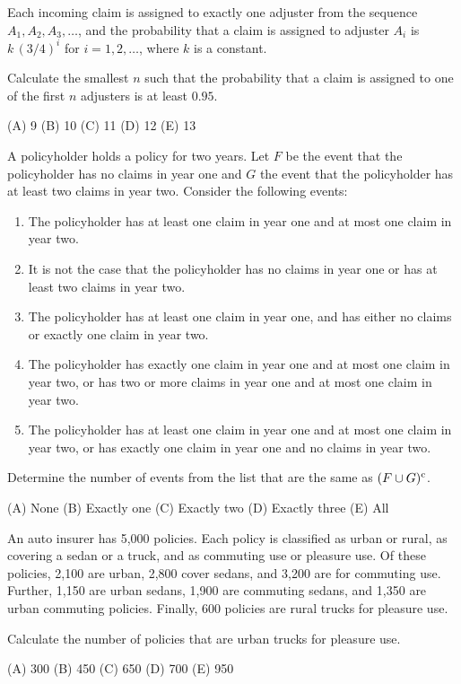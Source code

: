 \begin{practice}
Each incoming claim is assigned to exactly one adjuster from the sequence
$A_1, A_2, A_3, \ldots$, and the probability that a claim is assigned to adjuster
$A_i$ is $k\,(3/4)^i$ for $i = 1, 2, \ldots$, where $k$ is a constant.

Calculate the smallest $n$ such that the probability that a claim is assigned to one
of the first $n$ adjusters is at least $0.95$.

(A) 9 \qquad (B) 10 \qquad (C) 11 \qquad (D) 12 \qquad (E) 13
\end{practice}

\begin{practice}
A policyholder holds a policy for two years. Let $F$ be the event that the
policyholder has no claims in year one and $G$ the event that the policyholder has
at least two claims in year two. Consider the following events:
\begin{enumerate}[nosep,label=(\roman*)]
  \item The policyholder has at least one claim in year one and at most one claim in
        year two.
  \item It is not the case that the policyholder has no claims in year one or has at
        least two claims in year two.
  \item The policyholder has at least one claim in year one, and has either no claims
        or exactly one claim in year two.
  \item The policyholder has exactly one claim in year one and at most one claim in
        year two, or has two or more claims in year one and at most one claim in
        year two.
  \item The policyholder has at least one claim in year one and at most one claim in
        year two, or has exactly one claim in year one and no claims in year two.
\end{enumerate}
Determine the number of events from the list that are the same as $(F \cup G)^{\mathrm{c}}$.

(A) None \qquad (B) Exactly one \qquad (C) Exactly two \qquad (D) Exactly three \qquad (E) All
\end{practice}

\begin{practice}
An auto insurer has 5{,}000 policies. Each policy is classified as urban or rural,
as covering a sedan or a truck, and as commuting use or pleasure use. Of these
policies, 2{,}100 are urban, 2{,}800 cover sedans, and 3{,}200 are for commuting
use. Further, 1{,}150 are urban sedans, 1{,}900 are commuting sedans, and 1{,}350
are urban commuting policies. Finally, 600 policies are rural trucks for pleasure use.

Calculate the number of policies that are urban trucks for pleasure use.

(A) 300 \qquad (B) 450 \qquad (C) 650 \qquad (D) 700 \qquad (E) 950
\end{practice}

